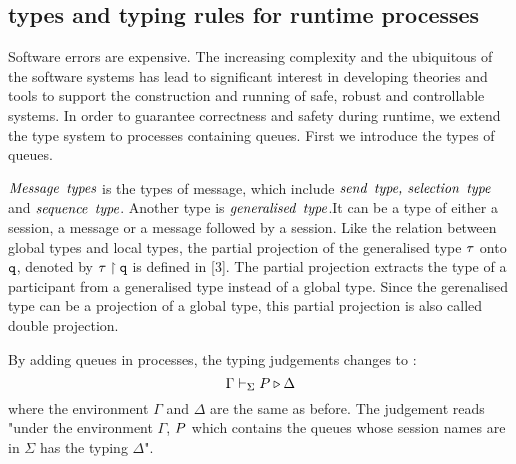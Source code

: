 \documentclass[a4paper]{article}
\begin{document}
\subsection{types and typing rules for runtime processes}
Software errors are expensive. The increasing complexity and the ubiquitous of the software systems has lead to significant interest in developing theories and tools to support the
construction and running of safe, robust and controllable systems. In order to  guarantee  correctness and safety during  runtime, we extend the type system to processes containing queues. First we introduce the types of queues.

$\emph{Message \,types}$ is  the types of message, which include $\emph{send\, type, selection \,type}$ and $\emph{sequence \,type}$. Another type is  $\emph{generalised\, type}$.It can be a type of either a session, a message or a message followed by  a session. Like the relation between global types and local types,  the partial projection of the generalised type ${\tau}$ onto $\mathtt{q}$, denoted by ${\tau}\upharpoonright\mathtt{q}$ is defined in [3]. The partial projection extracts the type of a participant from a generalised type instead of a global type. Since the gerenalised type can be a projection of a global type, this partial projection is also called double projection.

By adding queues in processes, the typing judgements changes to :
\[\Gamma \vdash_{\Sigma} P \triangleright \Delta\] 
where the environment $\Gamma$ and $\Delta$ are the same as before. The judgement reads "under the environment $\Gamma$, $P$ which contains the queues whose session names are in $\Sigma$ has the typing $\Delta$". 
\end{document}
